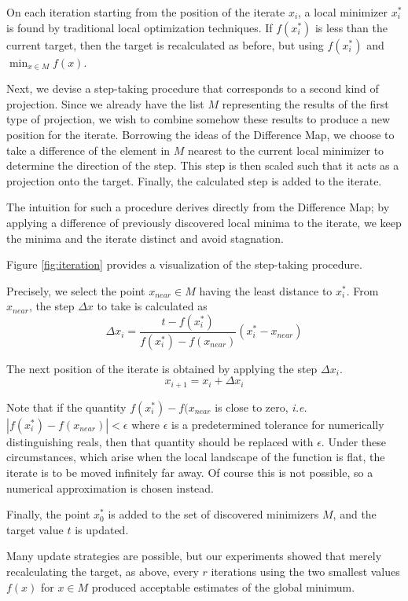 \documentclass[12pt]{article}
\begin{document}
On each iteration starting from the position of the iterate $x_i$, a local
minimizer $x_i^*$ is found by traditional local optimization techniques.
If $f(x_i^*)$ is less than the current target, then the target is
recalculated as before, but using $f(x_i^*)$ and $\min_{x \in M} f(x)$.

Next, we devise a step-taking procedure that corresponds to a second kind
of projection. Since we already have the list $M$ representing the results of
the first type of projection, we wish to combine somehow these results to
produce a new position for the iterate. Borrowing the ideas of the Difference
Map, we choose to take a difference of the element in $M$ nearest to the
current local minimizer to determine the direction of the step. This step is
then scaled such that it acts as a projection onto the target. Finally, the
calculated step is added to the iterate.

The intuition for such a procedure derives directly from the Difference Map;
by applying a difference of previously discovered local minima to the iterate,
we keep the minima and the iterate distinct and avoid stagnation.

Figure \ref{fig:iteration} provides a visualization of the step-taking
procedure.

Precisely, we select the point $x_{near} \in M$ having the least distance to
$x_i^*$.
From $x_{near}$, the step $\Delta x$ to take is calculated as
\begin{equation*}
    \Delta x_i =
        \frac{t - f(x_i^*)}{f(x_i^*) - f(x_{near})} (x_i^* - x_{near})
    \label{eqn:dx}
\end{equation*}

The next position of the iterate is obtained by applying the step
$\Delta x_i$.
$$
    x_{i+1} = x_i + \Delta x_i
$$

Note that if the quantity $f(x_i^*) - f(x_{near}$ is close to zero,
\emph{i.e.} $|f(x_i^*) - f(x_{near})| < \epsilon$ where $\epsilon$ is a
predetermined tolerance for numerically distinguishing reals, then that
quantity should be replaced with $\epsilon$.  Under these circumstances,
which arise when the local landscape of the function is flat, the iterate is
to be moved infinitely far away.  Of course this is not possible, so a
numerical approximation is chosen instead.

Finally, the point $x_0^*$ is added to the set of discovered minimizers
$M$, and the target value $t$ is updated.

Many update strategies are possible, but our experiments showed that merely
recalculating the target, as above, every $r$ iterations using the two
smallest values $f(x)$ for $x \in M$ produced acceptable estimates of the
global minimum.
\end{document}
